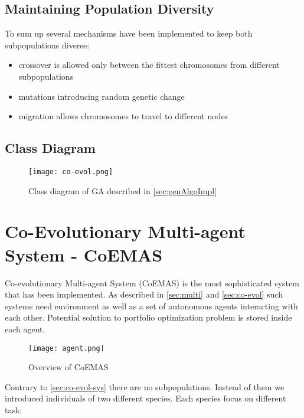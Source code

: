 \subsection{Maintaining Population Diversity}

To sum up several mechanisms have been implemented to keep both subpopulations diverse:

\begin{itemize}
  \item crossover is allowed only between the fittest chromosomes from different subpopulations 
  \item mutations introducing random genetic change
  \item migration allows chromosomes to travel to different nodes  
\end{itemize}

\subsection{Class Diagram}

\begin{figure}[H]   
	    \begin{center}
	      \texttt{[image: co-evol.png]}
	    \end{center}
	    \caption{Class diagram of GA described in \ref{sec:genAlgoImpl}} 
	  \end{figure}


\section{Co-Evolutionary Multi-agent System - CoEMAS}

Co-evolutionary Multi-agent System (CoEMAS) is the most sophisticated system that has been implemented.
As described in \ref{sec:multi} and \ref{sec:co-evol} such systems need environment as well as a set of autonomous agents interacting with each other.
Potential solution to portfolio optimization problem is stored inside each agent.


\begin{figure}[H]   
	    \begin{center}
	      \texttt{[image: agent.png]}
	    \end{center}
	    \caption{Overview of CoEMAS} 
	  \end{figure}

Contrary to \ref{sec:co-evol-sys} there are no subpopulations.
Instead of them we introduced individuals of two different species.
Each species focus on different task:

